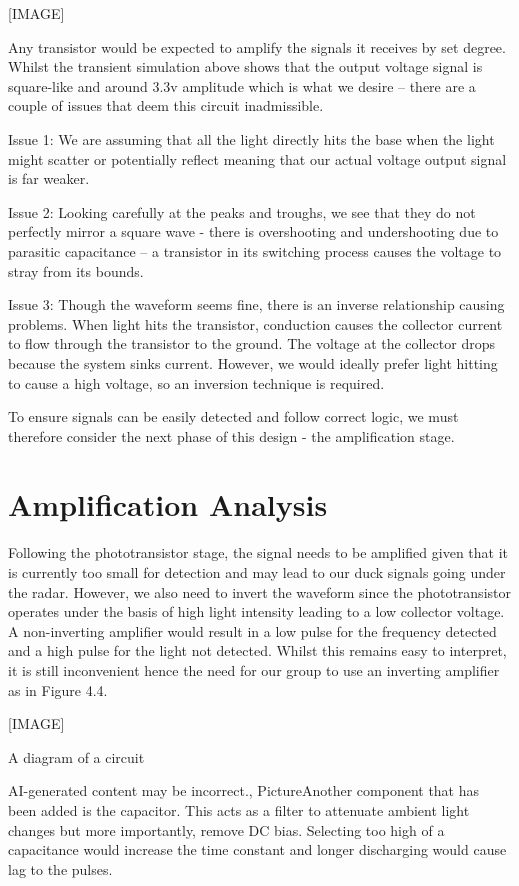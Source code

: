     [IMAGE]

Any transistor would be expected to amplify the signals it receives by set degree. Whilst the transient simulation above shows that the output voltage signal is square-like and around 3.3v amplitude which is what we desire – there are a couple of issues that deem this circuit inadmissible.

Issue 1: We are assuming that all the light directly hits the base when the light might scatter or potentially reflect meaning that our actual voltage output signal is far weaker.

Issue 2: Looking carefully at the peaks and troughs, we see that they do not perfectly mirror a square wave - there is overshooting and undershooting due to parasitic capacitance – a transistor in its switching process causes the voltage to stray from its bounds.

Issue 3: Though the waveform seems fine, there is an inverse relationship causing problems. When light hits the transistor, conduction causes the collector current to flow through the transistor to the ground. The voltage at the collector drops because the system sinks current. However, we would ideally prefer light hitting to cause a high voltage, so an inversion technique is required.

To ensure signals can be easily detected and follow correct logic, we must therefore consider the next phase of this design - the amplification stage.

\section{Amplification Analysis}
Following the phototransistor stage, the signal needs to be amplified given that it is currently too small for detection and may lead to our duck signals going under the radar. However, we also need to invert the waveform since the phototransistor operates under the basis of high light intensity leading to a low collector voltage. A non-inverting amplifier would result in a low pulse for the frequency detected and a high pulse for the light not detected. Whilst this remains easy to interpret, it is still inconvenient hence the need for our group to use an inverting amplifier as in Figure 4.4.

    [IMAGE]

A diagram of a circuit

AI-generated content may be incorrect., PictureAnother component that has been added is the capacitor. This acts as a filter to attenuate ambient light changes but more importantly, remove DC bias. Selecting too high of a capacitance would increase the time constant and longer discharging would cause lag to the pulses.


